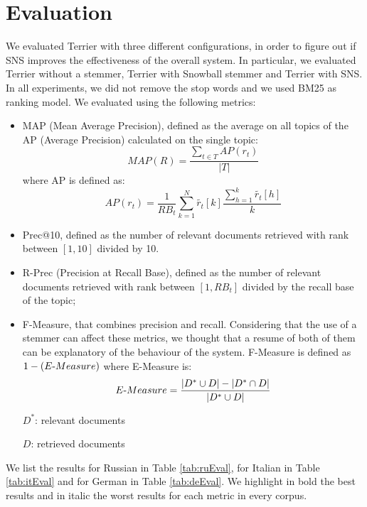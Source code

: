 \section{Evaluation}
We evaluated Terrier\cite{terrier} with three different configurations, in order to figure out if SNS improves the effectiveness of the overall system. In particular, we evaluated Terrier without a stemmer, Terrier with Snowball\cite{snowball} stemmer and Terrier with SNS. In all experiments, we did not remove the stop words and we used BM25 as ranking model. We evaluated using the following metrics:

\begin{itemize}
\item MAP (Mean Average Precision), defined as the average on all topics of the AP (Average Precision) calculated on the single topic:
\begin{equation}
MAP(R) = \frac{\sum_{t \in T}AP(r_t)}{|T|}
\end{equation}
where AP is defined as:
\begin{equation}
AP(r_t)=\frac{1}{RB_t}\sum_{k=1}^{N}\widetilde{r_t}[k]\frac{\sum_{h=1}^{k}\widetilde{r_t}[h]}{k}
\end{equation}

\item Prec@10, defined as the number of relevant documents retrieved with rank between $[1, 10]$ divided by 10.

\item R-Prec (Precision at Recall Base), defined as the number of relevant documents retrieved with rank between $[1,RB_t]$ divided by the recall base of the topic;

\item F-Measure, that combines precision and recall. Considering that the use of a stemmer can affect these metrics, we thought that a resume of both of them can be explanatory of the behaviour of the system. F-Measure is defined as $1 - (E\textnormal{-}Measure)$ where E-Measure is:
\begin{equation}
E\textnormal{-}Measure=\frac{|D^{*}\cup D|-|D^{*}\cap D|}{|D^{*}\cup D|}
\end{equation}

$D^{*}$: relevant documents

$D$: retrieved documents

\end{itemize}

We list the results for Russian in Table \ref{tab:ruEval}, for Italian in Table \ref{tab:itEval} and for German in Table \ref{tab:deEval}. We highlight in bold the best results and in italic the worst results for each metric in every corpus.


